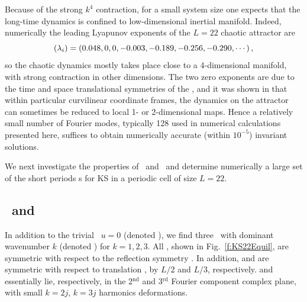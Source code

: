 Because of the strong $k^4$ contraction, for a small system size
one expects that the long-time dynamics is confined to low-dimensional
inertial manifold. Indeed, numerically the leading Lyapunov exponents of the
$L=22$ chaotic attractor are
\[
	(\lambda_i) = (0.048, 0, 0, -0.003, -0.189, -0.256, -0.290, \cdots)\,,
\]
so the chaotic dynamics mostly takes
place close to a 4-dimensional manifold, with strong
contraction in other dimensions.  The two zero exponents
are due to the
time and space translational symmetries of the \KSe,
and it was shown in 
that within particular curvilinear coordinate frames, the
dynamics on the attractor can sometimes be reduced to
local 1- or 2-dimensional maps.
Hence a relatively small
number of Fourier modes, typically 128 used in numerical calculations presented here,
suffices to obtain
numerically accurate (within $10^{-5}$) invariant
solutions.

We next investigate the properties of \eqva\ and \reqva\ and determine numerically
a large set of the short periods \rpo s for KS in a periodic cell of
size $L=22$.

\subsection{\Eqva\ and \reqva}

In addition to the trivial \eqv\ $u=0$ (denoted ),
we find three \eqva\ with dominant wavenumber $k$
(denoted ) for $k = 1, 2, 3$.  All {\eqva}, shown in
Fig.~\ref{f:KS22Equil}, are symmetric with respect to the reflection
symmetry .
In addition,  and  are symmetric with respect
to translation , by $L/2$ and $L/3$, respectively.
 and  essentially lie, respectively, in
the 2$^\mathrm{nd}$ and 3$^\mathrm{rd}$ Fourier component complex plane,
with small $k=2j$, $k=3j$ harmonics deformations.

